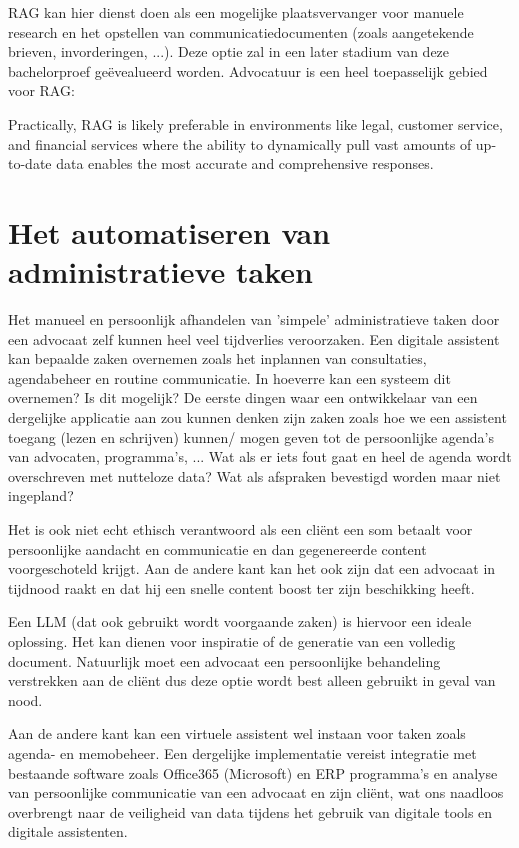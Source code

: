 RAG kan hier dienst doen als een mogelijke plaatsvervanger voor manuele research en het opstellen van communicatiedocumenten (zoals aangetekende brieven, invorderingen, ...). Deze optie zal in
een later stadium van deze bachelorproef geëvealueerd worden. Advocatuur is een heel toepasselijk gebied voor RAG:

\begin{displayquote}
	Practically, RAG is likely preferable in environments like
	legal, customer service, and financial services where the ability to
	dynamically pull vast amounts of up-to-date data enables the most accurate and comprehensive responses.
\end{displayquote}

\section{Het automatiseren van administratieve taken}
Het manueel en persoonlijk afhandelen van 'simpele' administratieve taken door een advocaat zelf kunnen heel veel tijdverlies veroorzaken. Een digitale assistent kan bepaalde zaken
overnemen zoals het inplannen van consultaties, agendabeheer en routine		communicatie. In hoeverre kan een systeem dit overnemen? Is dit mogelijk? 
De eerste dingen waar een ontwikkelaar van een dergelijke applicatie aan zou kunnen denken zijn zaken zoals hoe we een assistent toegang (lezen en schrijven) kunnen/ mogen geven tot 
de persoonlijke agenda's van advocaten, programma's, ... Wat als er iets fout gaat en heel de agenda wordt overschreven met nutteloze data? Wat als afspraken bevestigd worden maar niet ingepland? 

Het is ook niet echt ethisch verantwoord als een cliënt een som betaalt voor persoonlijke aandacht en communicatie en dan gegenereerde content voorgeschoteld krijgt. 
Aan de andere kant kan het ook zijn dat een advocaat in tijdnood raakt en dat hij een snelle content boost ter zijn beschikking heeft. 

Een LLM (dat ook gebruikt wordt voorgaande zaken) is hiervoor een ideale oplossing. Het kan dienen voor inspiratie of de generatie van een volledig document. Natuurlijk moet
een advocaat een persoonlijke behandeling verstrekken aan de cliënt dus deze optie wordt best alleen gebruikt in geval van nood. 

Aan de andere kant kan een virtuele assistent wel instaan voor taken zoals agenda- en memobeheer. 
Een dergelijke implementatie vereist integratie met bestaande software zoals Office365 (Microsoft) en ERP programma's en analyse van persoonlijke communicatie van een advocaat en zijn cliënt,
wat ons naadloos overbrengt naar de veiligheid van data tijdens het gebruik van digitale tools en digitale assistenten. 

